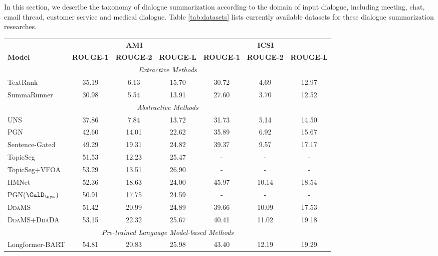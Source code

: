 \label{sec:tax}
In this section, we describe the taxonomy of dialogue summarization according to the domain of input dialogue, including meeting, chat, email thread, customer service and medical dialogue. Table \ref{tab:datasets} lists currently available datasets for these dialogue summarization researches. 
\begin{table}[t]
\small
\centering
        \begin{tabular}{l||ccc||ccc}
            \hline
            &  \multicolumn{3}{c||}{\textbf{AMI}} & \multicolumn{3}{c}{\textbf{ICSI}} \\
            \textbf{Model} & \textbf{ROUGE-1} & \textbf{ROUGE-2} & \textbf{ROUGE-L} & \textbf{ROUGE-1} & \textbf{ROUGE-2} & \textbf{ROUGE-L}  \\
            \hline
            \hline
            \multicolumn{7}{c}{\it Extractive Methods} \\
            \hline
            TextRank  &35.19 &6.13 &15.70 &30.72 &4.69 &12.97  \\
            SummaRunner  & 30.98 &5.54 &13.91 &27.60 &3.70 &12.52 \\
            \hline
            \hline
            \multicolumn{7}{c}{\it Abstractive Methods} \\
            \hline
            UNS  &37.86 &7.84 &13.72 & 31.73 & 5.14 & 14.50 \\
            PGN  &42.60 &14.01 &22.62 & 35.89 & 6.92 & 15.67 \\
            Sentence-Gated  & 49.29 & 19.31 & 24.82 & 39.37 & 9.57 & 17.17 \\
            TopicSeg  & 51.53 &12.23 &25.47  & - & - & - \\
            TopicSeg+VFOA  & 53.29 &13.51 &26.90  & - & - & - \\
            HMNet  & 52.36 & 18.63 &24.00 & 45.97 & 10.14 & 18.54 \\
            PGN($\CalD_{\sys}$)  &50.91 &17.75  &24.59 & - & - & - \\
            \textsc{DdaMS}  &51.42 &20.99 &24.89 &39.66 &10.09 &17.53 \\
            \textsc{DdaMS}+\textsc{DdaDA}  &53.15 &22.32 &25.67 &40.41 &11.02 &19.18 \\
            \hline
            \hline
            \multicolumn{7}{c}{\it Pre-trained Language Model-based Methods} \\
            \hline
            Longformer-BART  &54.81  &20.83  &25.98  & 43.40 & 12.19 & 19.29 \\

\end{tabular}
\end{table}
